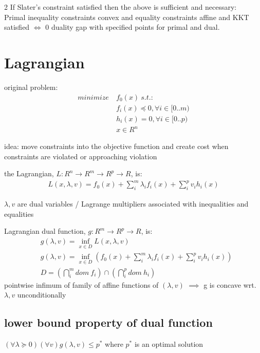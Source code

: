 \documentclass[8pt]{extarticle}
\begin{document}
\begin{multicols*}{2}
  If Slater's constraint satisfied then the above is sufficient and necessary:\\
  Primal inequality constraints convex and equality constraints affine and KKT satisfied $\iff$ 0 duality gap with specified points for primal and dual.\\
  
  \vfill\null
  \pagebreak

  \section{Lagrangian}
  original problem:
  \begin{align*}
    minimize\ &f_0(x)\ s.t.:\\
    &f_i(x) \preceq 0, \forall i \in [0..m)\\
    &h_i(x) = 0, \forall i \in [0..p)\\
    &x \in R^n
  \end{align*}

  idea: move constraints into the objective function and create cost when constraints are violated or approaching violation
  
  the Lagrangian, $L: R^n \rightarrow R^m \rightarrow R^p \rightarrow R$, is:
  \begin{align*}
    L(x,\lambda, v) = f_0(x) + \sum_i^m \lambda_i f_i(x) + \sum_i^p v_i h_i(x)
  \end{align*}

  $\lambda, v$ are dual variables / Lagrange multipliers associated with inequalities and equalities

  Lagrangian dual function, $g: R^m \rightarrow R^p \rightarrow R$, is:
  \begin{align*}
    &g(\lambda, v) = \inf_{x \in D} L(x,\lambda,v)\\
    &g(\lambda, v) = \inf_{x \in D} (f_0(x) + \sum_i^m \lambda_i f_i(x) + \sum_i^p v_i h_i(x))\\
    &D = (\bigcap_i^m dom\ f_i) \cap (\bigcap_i^p dom\ h_i)
  \end{align*}
  pointwise infimum of family of affine functions of $(\lambda, v)$ $\implies$ g is concave wrt. $\lambda, v$ unconditionally

  \subsection{lower bound property of dual function}

  $(\forall \lambda \succeq 0) (\forall v) g(\lambda, v) \leq p^*$ where $p^*$ is an optimal solution


\end{multicols*}
\end{document}
